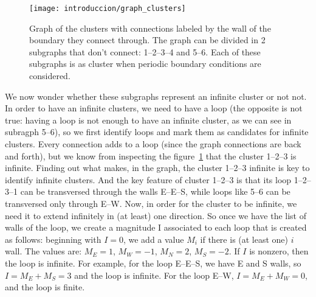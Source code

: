 \begin{figure}  \centering
  \texttt{[image: introduccion/graph\_clusters]}
  \caption{Graph of the clusters with connections labeled by the wall
    of the boundary they connect through. The graph can be divided in
    2 subgraphs that don't connect: 1--2--3--4 and 5--6. Each of these
    subgraphs is as cluster when periodic boundary conditions are
    considered.}
\label{fig:graph_clusters}
\end{figure}

We now wonder whether these subgraphs represent an infinite cluster or
not not. In order to have an infinite clusters, we need to have a loop
(the opposite is not true: having a loop is not enough to have an
infinite cluster, as we can see in subragph 5--6), so we first
identify loops and mark them as candidates for infinite
clusters. Every connection adds to a loop (since the graph connections
are back and forth), but we know from inspecting the
figure~\ref{fig:graph_clusters} that the cluster 1--2--3 is
infinite. Finding out what makes, in the graph, the cluster 1--2--3
infinite is key to identify infinite clusters. And the key feature of
cluster 1--2--3 is that its loop 1--2--3--1 can be transversed through
the walls E--E--S, while loops like 5--6 can be transversed only
through E--W. Now, in order for the cluster to be infinite, we need it
to extend infinitely in (at least) one direction. So once we have the
list of walls of the loop, we create a magnitude I associated to each
loop that is created as follows: beginning with $I = 0$, we add a
value $M_i$ if there is (at least one) $i$ wall. The values are: $M_E
= 1$, $M_W = -1$, $M_N = 2$, $M_S = -2$. If $I$ is nonzero, then the
loop is infinite. For example, for the loop E--E--S, we have E and S
walls, so $I = M_E + M_S = 3$ and the loop is infinite. For the loop
E--W, $I = M_E + M_W = 0$, and the loop is finite.